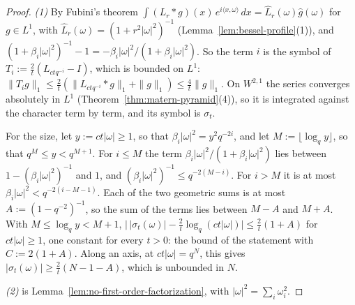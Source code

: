 \begin{proof}
\leanok
{}
\emph{(1)} By Fubini's theorem $\int (L_r * g)(x)\,e^{i\langle x,\omega\rangle}\,dx =
\widehat L_r(\omega)\widehat g(\omega)$ for $g \in L^1$, with $\widehat L_r(\omega) = (1 + r^2|\omega|^2)^{-1}$
(Lemma~\ref{lem:bessel-profile}(1)),
and $(1 + \beta_i|\omega|^2)^{-1} - 1 = -\beta_i|\omega|^2/(1 + \beta_i|\omega|^2)$. So the term
$i$ is the symbol of $T_i := \frac2t(L_{ctq^{-i}} - I)$, which is bounded on $L^1$:
$\|T_ig\|_1 \le \frac2t(\|L_{ctq^{-i}} * g\|_1 + \|g\|_1) \le \frac4t\|g\|_1$. On $W^{2,1}$ the series converges
absolutely in $L^1$ (Theorem~\ref{thm:matern-pyramid}(4)), so it is integrated against the
character term by term, and its symbol is $\sigma_t$.

For the size, let $y := ct|\omega| \ge 1$, so that $\beta_i|\omega|^2 = y^2q^{-2i}$, and let
$M := \lfloor\log_q y\rfloor$, so that $q^M \le y < q^{M+1}$. For $i \le M$ the term
$\beta_i|\omega|^2/(1 + \beta_i|\omega|^2)$ lies between $1 - (\beta_i|\omega|^2)^{-1}$ and $1$,
and $(\beta_i|\omega|^2)^{-1} \le q^{-2(M-i)}$. For $i > M$ it is at most
$\beta_i|\omega|^2 < q^{-2(i-M-1)}$. Each of the two geometric sums is at most
$A := (1 - q^{-2})^{-1}$, so the sum of the terms lies between $M - A$ and $M + A$. With
$M \le \log_q y < M + 1$,
$\bigl|\,|\sigma_t(\omega)| - \frac2t\log_q(ct|\omega|)\bigr| \le \frac2t(1 + A)$
for $ct|\omega| \ge 1$, one constant for every $t > 0$: the bound of the statement with
$C := 2(1 + A)$. Along an axis, at $ct|\omega| = q^N$, this
gives $|\sigma_t(\omega)| \ge \frac2t(N - 1 - A)$, which is unbounded in $N$.

\emph{(2)} is Lemma~\ref{lem:no-first-order-factorization}, with $|\omega|^2 = \sum_i\omega_i^2$.


\end{proof}
